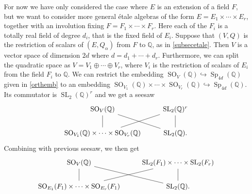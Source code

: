 \documentclass[11pt]{article} %
\newcommand{\8}{\infty}
\newcommand{\SO}{\operatorname{SO}}
\newcommand{\SL}{\operatorname{SL}}
\newcommand{\Sp}{\operatorname{Sp}}
\newcommand{\Q}{\mathbb{Q}}
\theoremstyle{mytheoremstyle}
\theoremstyle{remark}
\numberwithin{equation}{section}
\begin{document}
\subsubsection{}For now we have only considered the case where $E$ is an extension of a field $F$, but we want to consider more general \'etale algebras of the form $E=E_1 \times \cdots \times E_r$, together with an involution fixing $F=F_1 \times \cdots \times F_r$. Here each of the $F_i$ is a totally real field of degree $d_i$, that is the fixed field of $E_i$. Suppose that $(V,Q)$ is the restriction of scalars of $(E,Q_\alpha)$ from $F$ to $\Q$, as in \ref{subsecetale}. Then $V$ is a vector space of dimension $2d$ where $d=d_1+\cdots +d_r$. Furthermore, we can split the quadratic space as $V=V_1 \oplus \cdots \oplus V_r$, where $V_i$ is the restriction of scalars of $E_i$ from the field $F_i$ to $\Q$. We can restrict the embedding $\SO_V(\Q) \hookrightarrow \Sp_{4d}(\Q)$ given in \ref{orthemb} to an embedding $\SO_{V_1}(\Q) \times \cdots \times \SO_{V_r}(\Q) \hookrightarrow \Sp_{4d}(\Q)$. Its commutator is $\SL_2(\Q)^r$ and we get a seesaw
\[
\begin{tikzcd}
\SO_V(\Q) \arrow[dash, dr] & \SL_2(\Q)^r \\
\SO_{V_1}(\Q) \times \cdots \times \SO_{V_r}(\Q) \arrow[dash]{u} \arrow[dash, ru] & \SL_2(\Q). \arrow[dash]{u}
\end{tikzcd}
\]
Combining with previous seesaw, we then get
\[
\begin{tikzcd}
\SO_V(\Q) \arrow[dash, dr] & \SL_2(F_1) \times \cdots \times \SL_2(F_r)  \\
\SO_{E_1}(F_1) \times \cdots \times \SO_{E_r}(F_1) \arrow[dash]{u} \arrow[dash, ru] & \SL_2(\Q) . \arrow[dash]{u}
\end{tikzcd}
\]
\end{document}
